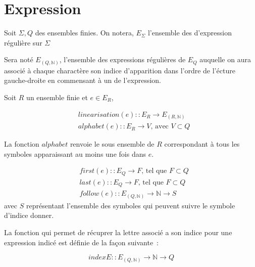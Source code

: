 \documentclass{article}
\begin{document}

\section{Expression}

Soit \(\Sigma, Q\) des ensembles finies. On notera, \(E_{\Sigma}\) l'ensemble 
des d'expression régulière sur \(\Sigma\)

Sera noté \(E_{(Q, \mathbb{N})}\), l'ensemble des expressions régulières de 
\(E_Q\) auquelle on aura associé à chaque charactère son indice d'apparition 
dans l'ordre de l'écture gauche-droite en commensant à un de l'expression.

Soit \(R\) un ensemble finie et \(e \in E_R\),

\begin{equation*}
  \begin{split}
  & linearisation(e) :: E_R \to E_{(R, \mathbb{N})} \\
  & alphabet(e) :: E_R \to V \text{, avec } V \subset Q
  \end{split}
\end{equation*}

La fonction \(alphabet\) renvoie le sous ensemble de \(R\) correspondant à tous 
les symboles apparaissant au moins une fois dans \(e\).

\begin{equation*}
  \begin{split}
  & first(e) :: E_Q \to F \text{, tel que } F \subset Q \\
  & last(e) :: E_Q \to F \text{, tel que } F \subset Q \\
  & follow(e) :: E_{(Q, \mathbb{N})} \to \mathbb{N} \to S 
  \end{split}
\end{equation*}
avec \(S\) représentant l'ensemble des symboles qui peuvent suivre le symbole 
d'indice donner.

La fonction qui permet de récuprer la lettre associé a son indice pour une 
expression indicé est définie de la façon suivante~:

\[
indexE :: E_{(Q, \mathbb{N})} \to \mathbb{N} \to Q
\]
\end{document}
